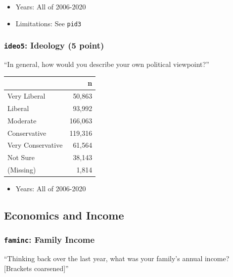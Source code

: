 \documentclass[10pt,article,oneside]{memoir}
\theoremstyle{definition}
\begin{document}
\begin{itemize}
\tightlist
\item
  Years: All of 2006-2020
\item
  Limitations: See \texttt{pid3}
\end{itemize}

\hypertarget{ideo5-ideology-5-point}{%
\subsubsection{\texorpdfstring{\texttt{ideo5}: Ideology (5
point)}{ideo5: Ideology (5 point)}}\label{ideo5-ideology-5-point}}

``In general, how would you describe your own political viewpoint?''

\begin{table}[H]
\centering
\begin{tabular}{lr}
\toprule
 & n\\
\midrule
Very Liberal & 50,863\\
Liberal & 93,992\\
Moderate & 166,063\\
Conservative & 119,316\\
Very Conservative & 61,564\\
Not Sure & 38,143\\
(Missing) & 1,814\\
\bottomrule
\end{tabular}
\end{table}

\begin{itemize}
\tightlist
\item
  Years: All of 2006-2020
\end{itemize}

\hypertarget{economics-and-income}{%
\subsection{Economics and Income}\label{economics-and-income}}

\hypertarget{faminc-family-income}{%
\subsubsection{\texorpdfstring{\texttt{faminc}: Family
Income}{faminc: Family Income}}\label{faminc-family-income}}

``Thinking back over the last year, what was your family's annual
income? {[}Brackets coarsened{]}''
\end{document}
